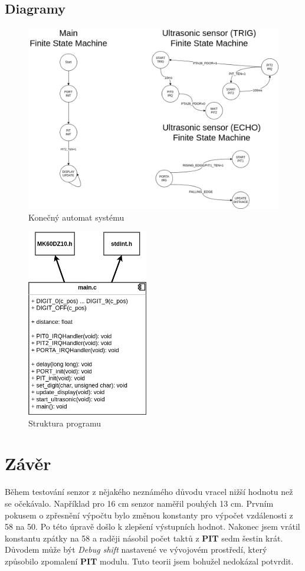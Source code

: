 \documentclass[a4paper,11pt]{article}
\begin{document}
    \subsection{Diagramy}
    \begin{figure}[ht!]
        \centering
        \includegraphics[width=450pt]{FSM}
        \caption{Konečný automat systému}
    \end{figure}
    \begin{figure}[ht!]
        \centering
        \includegraphics[width=150pt]{program}
        \caption{Struktura programu}
    \end{figure}
    \newpage

    \section{Závěr}
    Během testování senzor z nějakého neznámého důvodu vracel nižší hodnotu než se očekávalo. Například pro 16 cm senzor naměřil pouhých 13 cm.
    Prvním pokusem o zpřesnění výpočtu bylo změnou konstanty pro výpočet vzdálenosti z 58 na 50. Po této úpravě došlo k zlepšení výstupních hodnot.
    Nakonec jsem vrátil konstantu zpátky na 58 a raději násobil počet taktů z \textbf{PIT} sedm šestin krát. Důvodem může být \emph{Debug shift}
    nastavené ve vývojovém prostředí, který způsobilo zpomalení \textbf{PIT} modulu. Tuto teorii jsem bohužel nedokázal potvrdit.
    
\end{document}
